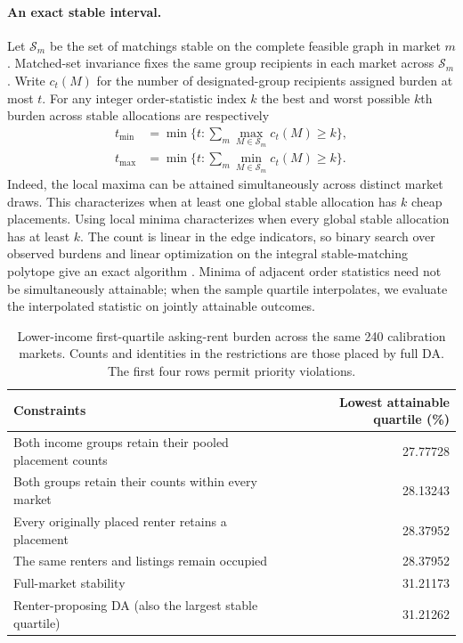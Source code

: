 \paragraph{An exact stable interval.}
Let $\mathcal S_m$ be the set of matchings stable on the complete feasible graph in market $m$. Matched-set invariance fixes the same group recipients in each market across $\mathcal S_m$. Write $c_t(M)$ for the number of designated-group recipients assigned burden at most $t$. For any integer order-statistic index $k$ the best and worst possible $k$th burden across stable allocations are respectively
\begin{align*}
 t_{\min}&=\min\{t:\sum_m \max_{M\in\mathcal S_m}c_t(M)\ge k\},\\
 t_{\max}&=\min\{t:\sum_m \min_{M\in\mathcal S_m}c_t(M)\ge k\}.
\end{align*}
Indeed, the local maxima can be attained simultaneously across distinct market draws. This characterizes when at least one global stable allocation has $k$ cheap placements. Using local minima characterizes when every global stable allocation has at least $k$. The count is linear in the edge indicators, so binary search over observed burdens and linear optimization on the integral stable-matching polytope give an exact algorithm \citep{rothblum1992polytope,gorski2009}. Minima of adjacent order statistics need not be simultaneously attainable; when the sample quartile interpolates, we evaluate the interpolated statistic on jointly attainable outcomes.

\begin{table}[t]\centering
\caption{Lower-income first-quartile asking-rent burden across the same 240 calibration markets. Counts and identities in the restrictions are those placed by full DA. The first four rows permit priority violations.}
\label{tab:welfare}
\begin{tabular}{@{}lr@{}}\toprule
Constraints & Lowest attainable quartile (\%)\\\midrule
Both income groups retain their pooled placement counts & 27.77728\\
Both groups retain their counts within every market & 28.13243\\
Every originally placed renter retains a placement & 28.37952\\
The same renters and listings remain occupied & 28.37952\\
Full-market stability & 31.21173\\\midrule
Renter-proposing DA (also the largest stable quartile) & 31.21262\\\bottomrule
\end{tabular}
\end{table}

